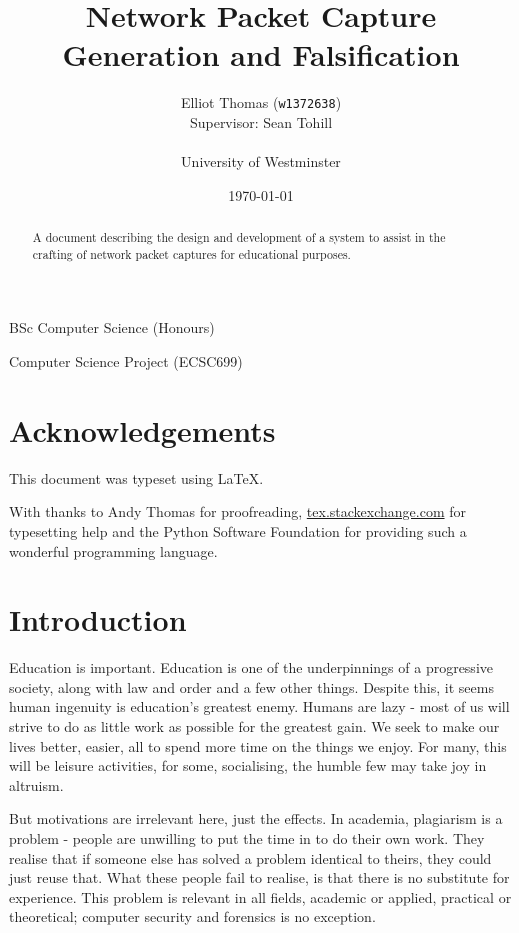 \documentclass[10pt,a4paper,notitlepage]{report}
\author{Elliot Thomas (\texttt{w1372638})\\ \small Supervisor: Sean Tohill\\ \\ University of Westminster}
\title{Network Packet Capture Generation and Falsification}
\date{\today}
\begin{document}
\maketitle
\begin{center}
BSc Computer Science (Honours)

Computer Science Project (ECSC699)
\end{center}
\begin{abstract}
\begin{center}
A document describing the design and development of a system to assist in the crafting of network packet captures for educational purposes.
\end{center}
\end{abstract}
\let\thefootnote\relax{}
\pagebreak
\listoffigures
\lstlistoflistings
\tableofcontents

\setlength{\parskip}{0.8em}

\pagebreak
\chapter*{Acknowledgements}
\thispagestyle{empty}
This document was typeset using \LaTeX.

With thanks to Andy Thomas for proofreading, \url{tex.stackexchange.com} for typesetting help and the Python Software Foundation for providing such a wonderful programming language.
\pagebreak
\chapter{Introduction}
Education is important. Education is one of the underpinnings of a progressive society, along with law and order and a few other things.
Despite this, it seems human ingenuity is education's greatest enemy. Humans are lazy - most of us will strive to do as little work as possible for the greatest gain.
We seek to make our lives better, easier, all to spend more time on the things we enjoy. For many, this will be leisure activities, for some, socialising, the humble few may take joy in altruism.

But motivations are irrelevant here, just the effects.
In academia, plagiarism is a problem - people are unwilling to put the time in to do their own work. They realise that if someone else has solved a problem identical to theirs, they could just reuse that.
What these people fail to realise, is that there is no substitute for experience. This problem is relevant in all fields, academic or applied, practical or theoretical; computer security and forensics is no exception.
\end{document}
